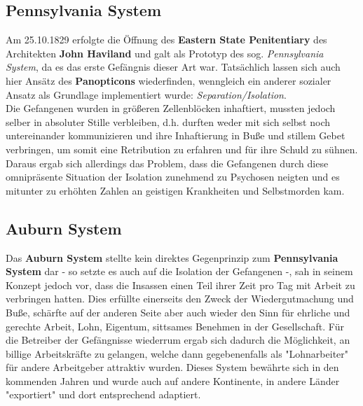 \subsection{Pennsylvania System}
Am 25.10.1829 erfolgte die Öffnung des \textbf{Eastern State Penitentiary} des Architekten \textbf{John Haviland} und galt als Prototyp des sog. \textit{Pennsylvania System}, da es das erste Gefängnis dieser Art war.
Tatsächlich lassen sich auch hier Ansätz des \textbf{Panopticons} wiederfinden, wenngleich ein anderer sozialer Ansatz als Grundlage implementiert wurde: \textit{Separation/Isolation}. \\
Die Gefangenen wurden in größeren Zellenblöcken inhaftiert, mussten jedoch selber in absoluter Stille verbleiben, d.h. durften weder mit sich selbst noch untereinander kommunizieren und ihre Inhaftierung in Buße und stillem Gebet verbringen, um somit eine Retribution zu erfahren und für ihre Schuld zu sühnen. Daraus ergab sich allerdings das Problem, dass die Gefangenen durch diese omnipräsente Situation der Isolation zunehmend zu Psychosen neigten und es mitunter zu erhöhten Zahlen an geistigen Krankheiten und Selbstmorden kam. 

\subsection{Auburn System}
Das \textbf{Auburn System} stellte kein direktes Gegenprinzip zum \textbf{Pennsylvania System} dar - so setzte es auch auf die Isolation der Gefangenen -, sah in seinem Konzept jedoch vor, dass die Insassen einen Teil ihrer Zeit pro Tag mit Arbeit zu verbringen hatten. Dies erfüllte einerseits den Zweck der Wiedergutmachung und Buße, schärfte auf der anderen Seite aber auch wieder den Sinn für ehrliche und gerechte Arbeit, Lohn, Eigentum, sittsames Benehmen in der Gesellschaft. Für die Betreiber der Gefängnisse wiederrum ergab sich dadurch die Möglichkeit, an billige Arbeitskräfte zu gelangen, welche dann gegebenenfalls als "Lohnarbeiter" für andere Arbeitgeber attraktiv wurden.
Dieses System bewährte sich in den kommenden Jahren und wurde auch auf andere Kontinente, in andere Länder "exportiert" und dort entsprechend adaptiert.